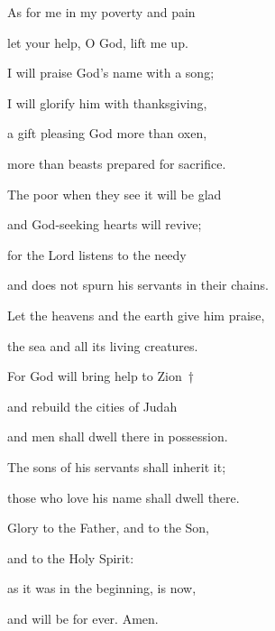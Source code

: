 \noindent As for me in my poverty and pain~\GreStar{}~\nopagebreak

let your help, O God, lift me up.

\noindent I will praise God’s name with a song;~\GreStar{}~\nopagebreak

I will glorify him with thanksgiving,

\noindent a gift pleasing God more than oxen,~\GreStar{}~\nopagebreak

more than beasts prepared for sacrifice.

\noindent The poor when they see it will be glad~\GreStar{}~\nopagebreak

and God-seeking hearts will revive;

\noindent for the Lord listens to the needy~\GreStar{}~\nopagebreak

and does not spurn his servants in their chains.

\noindent Let the heavens and the earth give him praise,~\GreStar{}~\nopagebreak

the sea and all its living creatures.

\noindent For God will bring help to Zion~†~\nopagebreak

and rebuild the cities of Judah~\GreStar{}~\nopagebreak

and men shall dwell there in possession.

\noindent The sons of his servants shall inherit it;~\GreStar{}~\nopagebreak

those who love his name shall dwell there.

\noindent Glory to the Father, and to the Son,~\GreStar{}~\nopagebreak

and to the Holy Spirit:

\noindent as it was in the beginning, is now,~\GreStar{}~\nopagebreak

and will be for ever. Amen.
